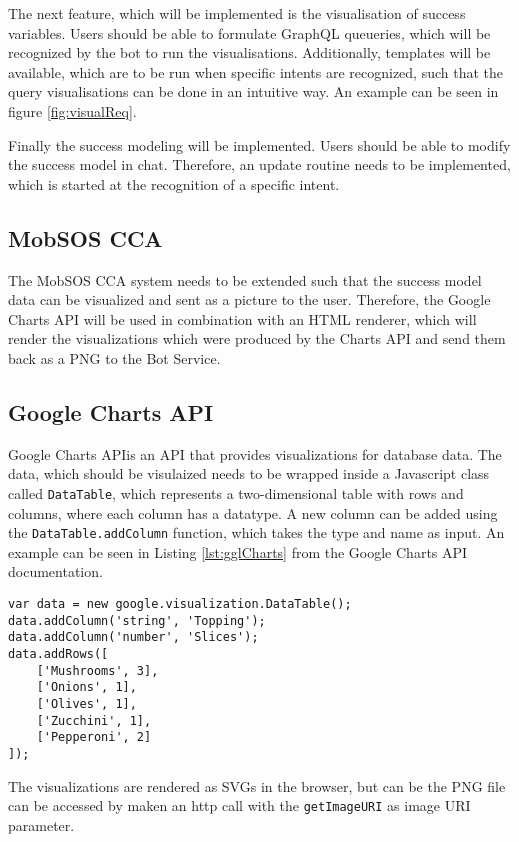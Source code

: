 The next feature, which will be implemented is the visualisation of success variables. Users should be able to formulate GraphQL queueries, which will be recognized by the bot to run the visualisations. Additionally, templates will be available, which are to be run when specific intents are recognized, such that the query visualisations can be done in an intuitive way. An example can be seen in figure \ref{fig:visualReq}.

Finally the success modeling will be implemented. Users should be able
to modify the success model in chat. Therefore, an update routine needs to be implemented, which is started at the recognition of a specific intent.

\subsection{MobSOS CCA}
The MobSOS CCA system needs to be extended such that the success model data can be visualized and sent as a picture to the user. Therefore, the Google Charts API will be used in combination with an HTML renderer, which will render the visualizations which were produced by the Charts API and send them back as a PNG to the Bot Service.

\subsection{Google Charts API}
Google Charts API\footnotemark is an API that provides visualizations for database data. The data, which should be visulaized needs to be wrapped inside a Javascript class called \texttt{DataTable}, which represents a two-dimensional table with rows and columns, where each column has a datatype.
A new column can be added using the \texttt{DataTable.addColumn} function, which takes the type and name as input. An example can be seen in Listing \ref{lst:gglCharts} from the Google Charts API documentation\footnotemark[\value{footnote}].

\begin{lstlisting}[caption=Example use of the DataTable class,captionpos=b,label={lst:gglCharts}]
var data = new google.visualization.DataTable();
data.addColumn('string', 'Topping');
data.addColumn('number', 'Slices');
data.addRows([
	['Mushrooms', 3],
	['Onions', 1],
	['Olives', 1], 
	['Zucchini', 1],
	['Pepperoni', 2]
]);
\end{lstlisting}

The visualizations are rendered as SVGs in the browser, but can be the PNG file can be accessed by maken an http call with the \texttt{getImageURI} as image URI parameter.

